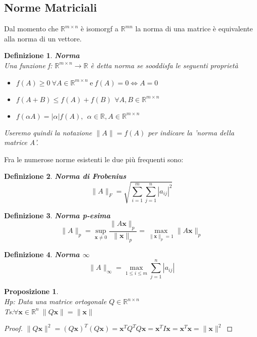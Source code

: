 \documentclass[11pt]{article}
\newtheorem{proposition}{Proposizione}
\newtheorem{definition}{Definizione}
\newcommand{\R}{\mathbb R}
\begin{document}
\subsection{Norme Matriciali}
Dal momento che $\R^{m \times n}$ è isomorgf a $\R^{mn}$ la norma di una matrice è equivalente alla norma di un vettore. 
\begin{definition}
	\textbf{Norma}\\ Una funzione f: $\R^{m \times n} \rightarrow \R$ è detta norma se sooddisfa le seguenti proprietà
	\begin{itemize}
		\item $f(A) \geq 0 \ \forall A\in \R^{m \times n} \ \text{e} \  f(A)=0 \iff A=0 $
		\item $f(A+B)\leq f(A)+f(B)\  \, \forall A,B \in \R^{m \times n}$ 
		\item $f(\alpha A)=|\alpha|f(A), \ \ \alpha \in \R, A \in \R^{m \times n}$
	\end{itemize}
Useremo quindi la notazione $\|A\|=f(A)$ per indicare la 'norma della matrice A'. 
\end{definition}
\noindent 
Fra le numerose norme esistenti le due più frequenti sono:
\begin{definition}
\textbf{Norma di Frobenius}\\
$$\|A\|_F=\sqrt{\sum_{i=1}^m\sum_{j=1}^n|a_{ij}|^2}$$
\end{definition}
\begin{definition}
\textbf{Norma p-esima}\\
$$ \|A\|_p = \sup_{\mathbf{x} \neq 0} \frac{\|A\mathbf{x}\|_p}{\|\mathbf{x}\|_p}=\max_{\|\mathbf{x}\|_p =1} \|A\mathbf{x}\|_p
$$
\end{definition}
\begin{definition}
\textbf{Norma $\infty$}\\
$$\|A\|_\infty = \max_{1 \leq i \leq m} \sum_{j=1}^{n} |a_{ij}|$$
\end{definition}
\begin{proposition}\label{cons norm}
\textbf{}\\
\textit{Hp:} Data una matrice ortogonale $Q \in \R^{n \times n}$\\
\textit{Ts:$\forall \mathbf{x}\in \R^n \ \|Q\mathbf{x}\|=\|\mathbf{x}\|$} 
\end{proposition}
\begin{proof} $\|Q\mathbf{x}\|^2 = (Q \mathbf{x})^T(Q \mathbf{x}) = \mathbf{x}^T Q^T Q \mathbf{x} = \mathbf{x}^TI\mathbf{x} = \mathbf{x}^T\mathbf{x} = \|\mathbf{x}\|^2$
\end{proof}
\end{document}
